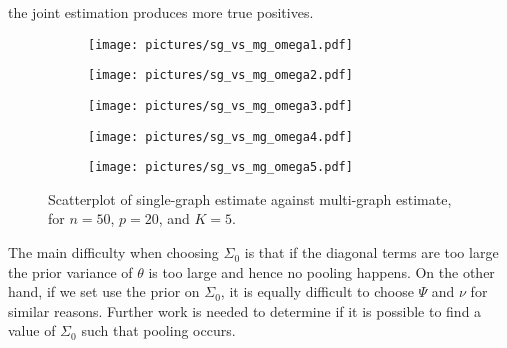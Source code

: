 \documentclass[a4paper, 11pt, oneside]{report}
\newcommand{\1}{\mathds{1}}
\begin{document}
the joint estimation produces more true positives.
\begin{figure}[tb]
	\centering
	\begin{subfigure}{0.49\textwidth}
		\texttt{[image: pictures/sg\_vs\_mg\_omega1.pdf]}
	\end{subfigure}
	\hfill
	\begin{subfigure}{0.49\textwidth}
		\texttt{[image: pictures/sg\_vs\_mg\_omega2.pdf]}
	\end{subfigure}
	\begin{subfigure}{0.49\textwidth}
		\texttt{[image: pictures/sg\_vs\_mg\_omega3.pdf]}
	\end{subfigure}
	\begin{subfigure}{0.49\textwidth}
		\texttt{[image: pictures/sg\_vs\_mg\_omega4.pdf]}
	\end{subfigure}
	\begin{subfigure}{0.49\textwidth}
		\texttt{[image: pictures/sg\_vs\_mg\_omega5.pdf]}
	\end{subfigure}

	\caption{Scatterplot of single-graph estimate against multi-graph estimate, for $n=50$, $p=20$, and $K=5$.}
	\label{fig:sgvsmg}
\end{figure}
The main difficulty when choosing $\Sigma_0$ is that if the diagonal terms are too large
the prior variance of $\theta$ is too large and hence no pooling happens.
On the other hand, if we set use the prior on $\Sigma_0$, it is equally difficult to choose
$\Psi$ and $\nu$ for similar reasons. Further work is needed to determine if it
is possible to find a value of $\Sigma_0$ such that pooling occurs.
\end{document}

